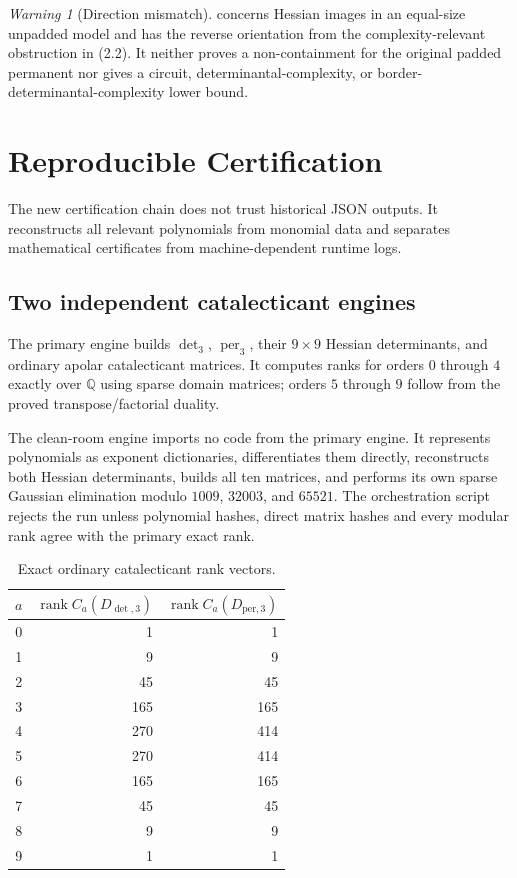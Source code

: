 \documentclass[11pt]{article}
\theoremstyle{definition}
\theoremstyle{remark}
\newtheorem{warning}[theorem]{Warning}
\DeclareMathOperator{\per}{per}
\DeclareMathOperator{\rk}{rank}
\newcommand{\Q}{\mathbb Q}
\begin{document}
\begin{warning}[Direction mismatch]
 concerns Hessian images in an equal-size unpadded model and
has the reverse orientation from the complexity-relevant obstruction in
\textup{(2.2)}.  It neither proves a non-containment for the original padded
permanent nor gives a circuit, determinantal-complexity, or border-
determinantal-complexity lower bound.
\end{warning}

\section{Reproducible Certification}

The new certification chain does not trust historical JSON outputs.  It
reconstructs all relevant polynomials from monomial data and separates
mathematical certificates from machine-dependent runtime logs.

\subsection{Two independent catalecticant engines}

The primary engine builds $\det_3$, $\per_3$, their $9\times9$ Hessian
determinants, and ordinary apolar catalecticant matrices.  It computes ranks for
orders $0$ through $4$ exactly over $\Q$ using sparse domain matrices; orders
$5$ through $9$ follow from the proved transpose/factorial duality.

The clean-room engine imports no code from the primary engine.  It represents
polynomials as exponent dictionaries, differentiates them directly,
reconstructs both Hessian determinants, builds all ten matrices, and performs
its own sparse Gaussian elimination modulo
$1009$, $32003$, and $65521$.  The orchestration script rejects the run unless
polynomial hashes, direct matrix hashes and every modular rank agree with the
primary exact rank.

\begin{table}[ht]
\centering
\small
\begin{tabular}{c@{\qquad}r@{\qquad}r}
\toprule
$a$ & $\rk C_a(D_{\det,3})$ & $\rk C_a(D_{\mathrm{per},3})$\\
\midrule
0&1&1\\1&9&9\\2&45&45\\3&165&165\\4&270&414\\
5&270&414\\6&165&165\\7&45&45\\8&9&9\\9&1&1\\
\bottomrule
\end{tabular}
\caption{Exact ordinary catalecticant rank vectors.}
\label{tab:ranks}
\end{table}
\end{document}
